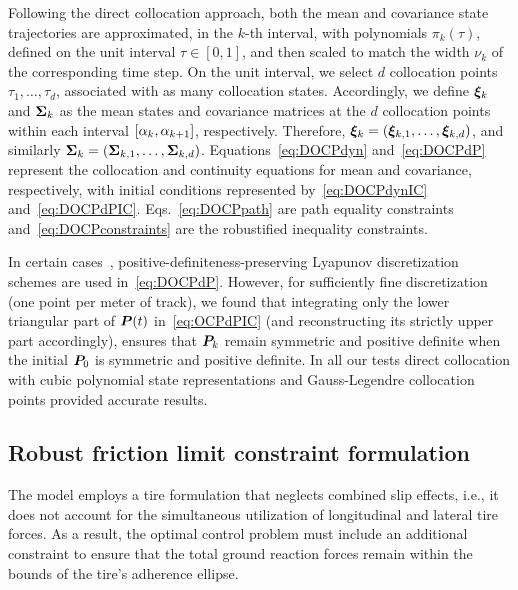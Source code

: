 Following the direct collocation approach, both the mean and covariance state trajectories are approximated, in the $k$-th interval, with polynomials $\pi_k(\tau)$, defined on the unit interval $\tau\in[0,1]$, and then scaled to match the width $\nu_k$ of the corresponding time step. On the unit interval, we select $d$ collocation points $\tau_1, \ldots, \tau_d$, associated with as many collocation states. Accordingly, we define $\boldsymbol{\xi}_k$ and $\boldsymbol{\Sigma}_k$ as the mean states and covariance matrices at the $d$ collocation points within each interval $[\alpha_k, \alpha_{k+1}]$, respectively. Therefore, $\boldsymbol{\xi}_k =
(\boldsymbol{\xi}_{k,1}, \ldots, \boldsymbol{\xi}_{k,d})$, and similarly $\boldsymbol{\Sigma}_k=(\boldsymbol{\Sigma}_{k,1}, \ldots, \boldsymbol{\Sigma}_{k,d})$. Equations~\eqref{eq:DOCPdyn} and~\eqref{eq:DOCPdP} represent the collocation and continuity equations for mean and covariance, respectively, with initial conditions represented by~\eqref{eq:DOCPdynIC} and~\eqref{eq:DOCPdPIC}. Eqs.~\eqref{eq:DOCPpath} are path equality constraints and~\eqref{eq:DOCPconstraints} are the robustified inequality constraints.

In certain cases~\cite{Gillis:PracticalMethodsApproximate:2015}, positive-definiteness-preserving Lyapunov discretization schemes are used in~\eqref{eq:DOCPdP}. However, for sufficiently fine discretization (one point per meter of track), we found that integrating only the lower triangular part of $\boldsymbol{P}(t)$ in~\eqref{eq:OCPdPIC}  (and reconstructing its strictly upper part accordingly), ensures that $\boldsymbol{P}_k$ remain symmetric and positive definite when the initial $\boldsymbol{P}_0$ is symmetric and positive definite. In all our tests direct collocation with cubic polynomial state representations and Gauss-Legendre collocation points provided accurate results.

\subsection{Robust friction limit constraint formulation}
\label{sec:FLC}
The model employs a tire formulation that neglects combined slip effects, i.e., it does not account for the simultaneous utilization of longitudinal and lateral tire forces. As a result, the optimal control problem must include an additional constraint to ensure that the total ground reaction forces remain within the bounds of the tire's adherence ellipse.

